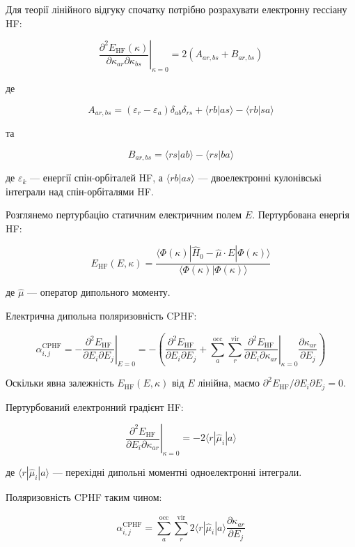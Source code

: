 \documentclass{PySCFBook}
\begin{document}
Для теорії лінійного відгуку спочатку потрібно розрахувати електронну гессіану HF:

\[\left. \frac{\partial^2 E_{\text{HF}}(\kappa)}{\partial \kappa_{ar} \partial \kappa_{bs}} \right|_{\kappa=0} = 2 (A_{ar,bs} + B_{ar,bs})\]

де

\[A_{ar,bs} = (\varepsilon_r - \varepsilon_a) \delta_{ab} \delta_{rs} + \langle rb | as \rangle - \langle rb | sa \rangle\]

та

\[B_{ar,bs} = \langle rs | ab \rangle - \langle rs | ba \rangle\]

де \(\varepsilon_k\) — енергії спін-орбіталей HF, а \(\langle rb | as \rangle\) — двоелектронні кулонівські інтеграли над спін-орбіталями HF.

Розглянемо пертурбацію статичним електричним полем \(E\). Пертурбована енергія HF:

\[E_{\text{HF}}(E, \kappa) = \frac{\langle \Phi(\kappa) | \hat{H}_0 - \hat{\mu} \cdot E | \Phi(\kappa) \rangle}{\langle \Phi(\kappa) | \Phi(\kappa) \rangle}\]

де \(\hat{\mu}\) — оператор дипольного моменту.

Електрична дипольна поляризовність CPHF:

\[\alpha^{\text{CPHF}}_{i,j} = -\left. \frac{\partial^2 E_{\text{HF}}}{\partial E_i \partial E_j} \right|_{E=0} = -\left( \frac{\partial^2 E_{\text{HF}}}{\partial E_i \partial E_j} + \sum_a^{\text{occ}} \sum_r^{\text{vir}} \left. \frac{\partial^2 E_{\text{HF}}}{\partial E_i \partial \kappa_{ar}} \right|_{\kappa=0} \frac{\partial \kappa_{ar}}{\partial E_j} \right)\]

Оскільки явна залежність \(E_{\text{HF}}(E, \kappa)\) від \(E\) лінійна, маємо \(\partial^2 E_{\text{HF}} / \partial E_i \partial E_j = 0\).

Пертурбований електронний градієнт HF:

\[\left. \frac{\partial^2 E_{\text{HF}}}{\partial E_i \partial \kappa_{ar}} \right|_{\kappa=0} = -2 \langle r | \hat{\mu}_i | a \rangle\]

де \(\langle r | \hat{\mu}_i | a \rangle\) — перехідні дипольні моментні одноелектронні інтеграли.

Поляризовність CPHF таким чином:

\[\alpha^{\text{CPHF}}_{i,j} = \sum_a^{\text{occ}} \sum_r^{\text{vir}} 2 \langle r | \hat{\mu}_i | a \rangle \frac{\partial \kappa_{ar}}{\partial E_j}\]
\end{document}
